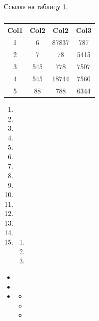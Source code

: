 \documentclass[xelatex,big]{G7-32-2017}
\begin{document}
Ссылка на таблицу \ref{ex:tb:1}.
\begin{table}[h]
    \centering
    \caption{\lipsum[3][3-5]}
    \label{ex:tb:1}
    \begin{tabular}{| c | c | c | c |}
        \hline
        Col1 & Col2 & Col2 & Col3 \\
        \hline
        1 & 6 & 87837 & 787 \\
        \hline 
        2 & 7 & 78 & 5415 \\
        \hline
        3 & 545 & 778 & 7507 \\
        \hline
        4 & 545 & 18744 & 7560 \\
        \hline
        5 & 88 & 788 & 6344 \\
        \hline
    \end{tabular}
\end{table}

\lipsum[1][1]
\begin{enumerate}
    \item \lipsum[1][1-2]
    \item \lipsum[1][3-4]
    \item \lipsum[1][5-6]
    \item \lipsum[1][1-2]
    \item \lipsum[1][3-4]
    \item \lipsum[1][5-6]
    \item \lipsum[1][1-2]
    \item \lipsum[1][3-4]
    \item \lipsum[1][5-6]
    \item \lipsum[1][1-2]
    \item \lipsum[1][3-4]
    \item \lipsum[1][5-6]
    \item \lipsum[1][1-2]
    \item \lipsum[1][3-4]
    \item \lipsum[1][5-6]
    \begin{enumerate}
        \item \lipsum[2][1-3]
        \item \lipsum[2][2]
        \item \lipsum[2][3]
    \end{enumerate}
\end{enumerate}
\begin{itemize}
    \item \lipsum[1][1-2]
    \item \lipsum[1][3-4]
    \item \lipsum[1][5-6]
    \begin{itemize}
        \item \lipsum[2][1-3]
        \item \lipsum[2][2]
        \item \lipsum[2][3]
    \end{itemize}
\end{itemize}
\end{document}
